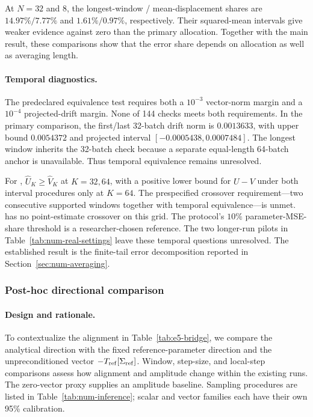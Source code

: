 At $N=32$ and $8$, the longest-window \Scaf{}/\FedAvg{} mean-displacement
shares are $14.97\%/7.77\%$ and $1.61\%/0.97\%$, respectively.
Their squared-mean intervals give weaker evidence against zero than the
primary allocation. Together with the main result, these comparisons show
that the error share depends on allocation as well as averaging length.

\paragraph{Temporal diagnostics.}
The predeclared equivalence test requires both a $10^{-3}$ vector-norm
margin and a $10^{-4}$ projected-drift margin. None of 144 checks meets
both requirements. In the primary \Scaf{} comparison, the first/last
32-batch drift norm is $0.0013633$, with upper bound $0.0054372$ and
projected interval $[-0.0005438,0.0007484]$. The longest window inherits
the 32-batch check because a separate equal-length 64-batch anchor is
unavailable. Thus temporal equivalence remains unresolved.

For \Scaf{}, $\widehat U_K\geq\widehat V_K$ at $K=32,64$, with a
positive lower bound for $U-V$ under both interval procedures only at
$K=64$. The prespecified crossover requirement---two consecutive supported
windows together with temporal equivalence---is unmet. \FedAvg{} has
no point-estimate crossover on this grid. The protocol's $10\%$
parameter-MSE-share threshold is a researcher-chosen reference.
The two longer-run pilots in Table~\ref{tab:num-real-settings} leave
these temporal questions unresolved. The established result is the
finite-tail error decomposition reported in Section~\ref{sec:num-averaging}.

\subsubsection{Post-hoc directional comparison}
\label{app:e5-bridge}

\paragraph{Design and rationale.}
To contextualize the alignment in Table~\ref{tab:e5-bridge}, we compare
the analytical direction with the fixed reference-parameter direction
and the unpreconditioned vector $-T_{\rm ref}[\Sigma_{\rm ref}]$.
Window, step-size, and local-step comparisons assess how alignment and
amplitude change within the existing runs. The zero-vector proxy supplies
an amplitude baseline. Sampling procedures are listed in
Table~\ref{tab:num-inference}; scalar and vector families each have their
own 95\% calibration.

